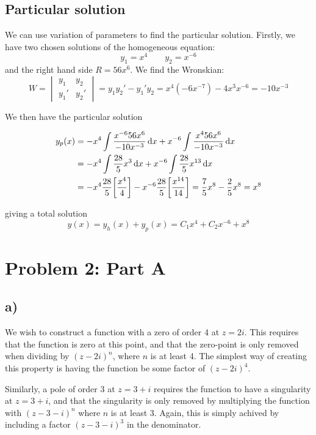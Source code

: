 \documentclass[10pt,a4paper]{article}
\begin{document}
\subsection*{Particular solution}
We can use variation of parameters to find the particular solution. Firstly, we have two chosen solutions of the homogeneous equation:
\begin{equation}
    y_1 = x^4 \quad\quad y_2 = x^{-6}
\end{equation}
and the right hand side $R = 56x^6$. We find the Wronskian:
\begin{equation}
    W = \begin{vmatrix} y_1 & y_2 \\ y_1' & y_2' \end{vmatrix} = y_1 y_2' - y_1'y_2 = x^4(-6x^{-7}) - 4x^3 x^{-6} = -10x^{-3}
\end{equation}

We then have the particular solution

\begin{align}
    y_p(x) &= -x^4\int \frac{x^{-6}56x^6}{-10x^{-3}}\dd{x} + x^{-6} \int \frac{x^4 56 x^6}{-10x^{-3}} \dd{x} \\
    &= -x^4\int\frac{28}{5}x^3 \dd{x} + x^{-6} \int \frac{28}{5}x^{13} \dd{x} \\
    &= -x^4\frac{28}{5}\qty[\frac{x^4}{4}] - x^{-6}\frac{28}{5}\qty[\frac{x^{14}}{14}] = \frac{7}{5}x^8 - \frac{2}{5}x^8 = x^8
\end{align}

giving a total solution
\begin{equation}
    y(x) = y_h(x) + y_p(x) = C_1x^4 + C_2x^{-6} + x^8
\end{equation}





\section*{Problem 2: Part A}
\subsection*{a)}
We wish to construct a function with a zero of order 4 at $z=2i$. This requires that the function is zero at this point, and that the zero-point is only removed when dividing by $(z-2i)^n$, where $n$ is at least 4. The simplest way of creating this property is having the function be some factor of $(z-2i)^4$.

Similarly, a pole of order 3 at $z=3+i$ requires the function to have a singularity at $z=3+i$, and that the singularity is only removed by multiplying the function with $(z-3-i)^n$ where $n$ is at least 3. Again, this is simply achived by including a factor $(z-3-i)^3$ in the denominator.
\end{document}
